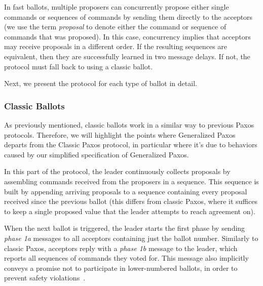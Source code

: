 In fast ballots, multiple proposers can concurrently propose either single commands or sequences of commands by sending them directly to the acceptors (we use the term \textit{proposal} to denote either the command or sequence of commands that was proposed).
In this case, concurrency implies that acceptors may receive proposals in a different order. If the resulting sequences are equivalent, then they are successfully learned in two message delays. If not, the protocol must fall back to using a classic ballot.

Next, we present the protocol for each type of ballot in detail.

\subsubsection{Classic Ballots} 

As previously mentioned, classic ballots work in a similar way to previous Paxos protocols. Therefore, we will highlight the points where Generalized Paxos departs from the Classic Paxos protocol, in particular where it's due to behaviors caused by our simplified specification of Generalized Paxos.\par
In this part of the protocol, the leader continuously collects proposals by assembling commands received from the proposers in a sequence. This sequence is built by appending arriving proposals to a sequence containing every proposal received since the previous ballot (this differs from classic Paxos, where it suffices to keep a single proposed value that the leader attempts to reach agreement on).\par
When the next ballot is triggered, the leader starts the first phase by sending \textit{phase 1a} messages to all acceptors containing just the ballot number. Similarly to classic Paxos, acceptors reply with a \textit{phase 1b} message to the leader, which reports all sequences of commands they voted for. This message also implicitly conveys a promise not to participate in lower-numbered ballots, in order to prevent safety violations~\cite{Lamport:1998}.

